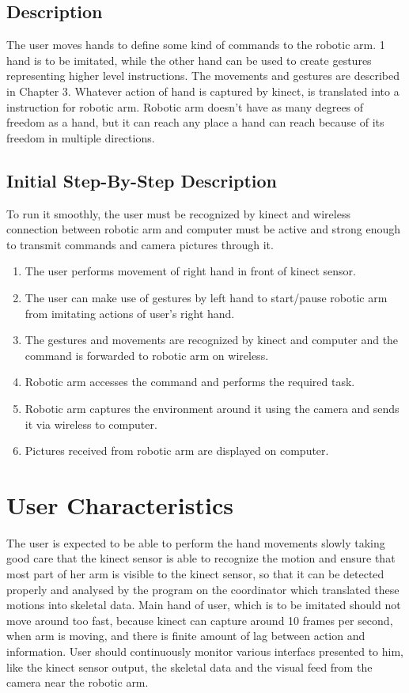 \documentclass[a4wide]{scrreprt}
\begin{document}
\subsection{Description}

The user moves hands to define some kind of commands to the robotic arm. 1 hand is to be imitated, while the other hand can be used to create gestures representing higher level instructions. The movements and gestures are described in Chapter 3. Whatever action of hand is captured by kinect, is translated into a instruction for robotic arm. Robotic arm doesn't have as many degrees of freedom as a hand, but it can reach any place a hand can reach because of its freedom in multiple directions. 

\subsection{Initial Step-By-Step Description}

To run it smoothly, the user must be recognized by kinect and wireless connection between robotic arm and computer must be active and strong enough to transmit commands and camera pictures through it.

\begin{enumerate}
\item The user performs movement of right hand in front of kinect sensor.
\item The user can make use of gestures by left hand to start/pause robotic arm from imitating actions of user's right hand.
\item The gestures and movements are recognized by kinect and computer and the command is forwarded to robotic arm on wireless.
\item Robotic arm accesses the command and performs the required task.
\item Robotic arm captures the environment around it using the camera and sends it via wireless to computer.
\item Pictures received from robotic arm are displayed on computer.
\end{enumerate}


\section{User Characteristics}

The user is expected to be able to perform the hand movements slowly taking good care that the kinect sensor is able to recognize the motion and ensure that most part of her arm is visible to the kinect sensor, so that it can be detected properly and analysed by the program on the coordinator which translated these motions into skeletal data. Main hand of user, which is to be imitated should not move around too fast, because kinect can capture around 10 frames per second, when arm is moving, and there is finite amount of lag between action and information. User should continuously monitor various interfacs presented to him, like the kinect sensor output, the skeletal data and the visual feed from the camera near the robotic arm.
\end{document}
